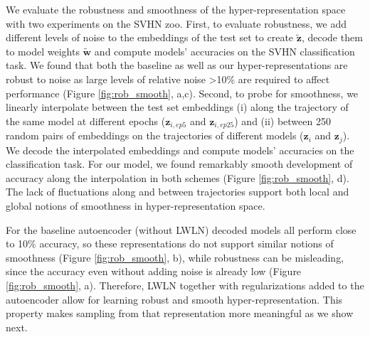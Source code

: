 \documentclass{article}
\begin{document}
We evaluate the robustness and smoothness of the hyper-representation space with two experiments on the SVHN zoo. First, to evaluate robustness, we add different levels of noise to the embeddings of the test set to create $\tilde{\mathbf{z}}$, decode them to model weights $\tilde{\mathbf{w}}$ and compute models' accuracies on the SVHN classification task. 
We found that both the baseline as well as our hyper-representations are robust to noise as large levels of relative noise >10\% are required to affect performance (Figure \ref{fig:rob_smooth}, a,c). 
Second, to probe for smoothness, we linearly interpolate between the test set embeddings (i) along the trajectory of the same model at different epochs ($\mathbf{z}_{i, ep5}$ and $\mathbf{z}_{i, ep25}$) and (ii) between 250 random pairs of embeddings on the trajectories of different models ($\mathbf{z}_{i}$ and $\mathbf{z}_{j}$).
We decode the interpolated embeddings and compute models' accuracies on the classification task. 
For our model, we found remarkably smooth development of accuracy along the interpolation in both schemes (Figure \ref{fig:rob_smooth}, d). The lack of fluctuations along and between trajectories support both local and global notions of smoothness in hyper-representation space.


For the baseline autoencoder (without LWLN) decoded models all perform close to 10\% accuracy, so these representations do not support similar notions of smoothness (Figure \ref{fig:rob_smooth}, b), while robustness can be misleading, since the accuracy even without adding noise is already low (Figure \ref{fig:rob_smooth}, a).
Therefore, LWLN together with regularizations added to the autoencoder allow for learning robust and smooth hyper-representation. This property makes sampling from that representation more meaningful as we show next.


\vspace{8pt}
%
%
\end{document}
